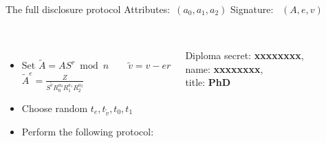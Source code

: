 \begin{frame}{The full disclosure protocol}
  Attributes:\, $(a_0, a_1, a_2)$ \quad Signature: \, $(A, e, v)$
  \\~\\
  \begin{columns}[onlytextwidth]
    \begin{itemize} \setlength\itemsep{0.5em}
      \item Set \quad $ \tilde{A} = AS^{r} \bmod n \qquad \tilde{v} = v - er $ \\[1em]
         {$\displaystyle \tilde{A}^e = \frac{Z}{S^{\tilde{v}} R_0^{a_0} R_1^{a_1} R_2^{a_2}} $ \\[1em]}
      \item<5-> Choose random $t_e, t_{\tilde{v}}, t_0, t_1$
      \item<6-> Perform the following protocol:
    \end{itemize}
    \begin{minipage}[t][3cm][t]{4cm}
      \begin{block}{Diploma}
        \vspace{0.5em}
        secret: \textbf{xxxxxxxx}, \\
        name: \textbf{xxxxxxxx}, \\
        title: \textbf{PhD}
        \vspace{0.5em}
      \end{block}
    \end{minipage}
  \end{columns}
\end{frame}
